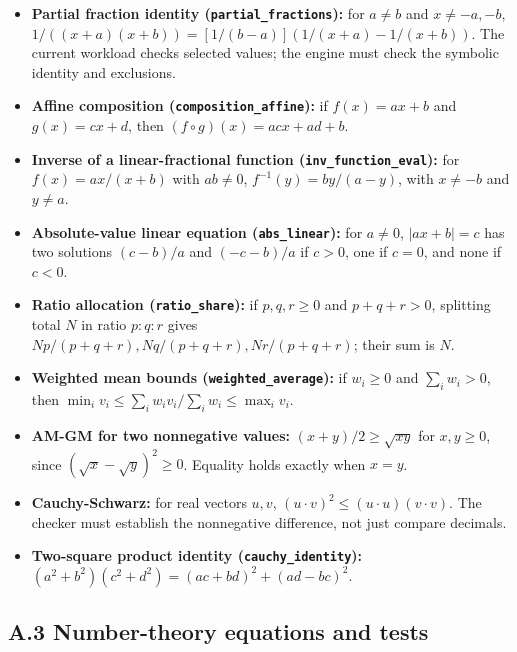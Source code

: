 \documentclass[
  10pt,
]{article}
\newcounter{none} %
\begin{document}
\begin{itemize}
\item
  \textbf{Partial fraction identity (\texttt{partial\_fractions}):} for
  \(a\ne b\) and \(x\ne-a,-b\),
  \(1/((x+a)(x+b))=[1/(b-a)](1/(x+a)-1/(x+b))\). The current workload
  checks selected values; the engine must check the symbolic identity
  and exclusions.
\item
  \textbf{Affine composition (\texttt{composition\_affine}):} if
  \(f(x)=ax+b\) and \(g(x)=cx+d\), then \((f\circ g)(x)=acx+ad+b\).
\item
  \textbf{Inverse of a linear-fractional function
  (\texttt{inv\_function\_eval}):} for \(f(x)=ax/(x+b)\) with
  \(ab\ne0\), \(f^{-1}(y)=by/(a-y)\), with \(x\ne-b\) and \(y\ne a\).
\item
  \textbf{Absolute-value linear equation (\texttt{abs\_linear}):} for
  \(a\ne0\), \(|ax+b|=c\) has two solutions \((c-b)/a\) and \((-c-b)/a\)
  if \(c>0\), one if \(c=0\), and none if \(c<0\).
\item
  \textbf{Ratio allocation (\texttt{ratio\_share}):} if \(p,q,r\ge0\)
  and \(p+q+r>0\), splitting total \(N\) in ratio \(p:q:r\) gives
  \(Np/(p+q+r),Nq/(p+q+r),Nr/(p+q+r)\); their sum is \(N\).
\item
  \textbf{Weighted mean bounds (\texttt{weighted\_average}):} if
  \(w_i\ge0\) and \(\sum_iw_i>0\), then
  \(\min_i v_i\le\sum_iw_iv_i/\sum_iw_i\le\max_i v_i\).
\item
  \textbf{AM-GM for two nonnegative values:} \((x+y)/2\ge\sqrt{xy}\) for
  \(x,y\ge0\), since \((\sqrt{x}-\sqrt{y})^2\ge0\). Equality holds
  exactly when \(x=y\).
\item
  \textbf{Cauchy-Schwarz:} for real vectors \(u,v\),
  \((u\cdot v)^2\le(u\cdot u)(v\cdot v)\). The checker must establish
  the nonnegative difference, not just compare decimals.
\item
  \textbf{Two-square product identity (\texttt{cauchy\_identity}):}
  \((a^2+b^2)(c^2+d^2)=(ac+bd)^2+(ad-bc)^2\).
\end{itemize}

\subsection{A.3 Number-theory equations and
tests}\label{a.3-number-theory-equations-and-tests}
\end{document}
